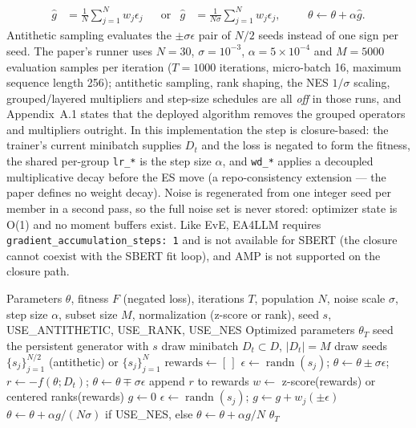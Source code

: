 \begin{align}
\hat g &= \frac{1}{N}\sum_{j=1}^{N} w_j \epsilon_j
&&\text{or}&
\hat g &= \frac{1}{N\sigma}\sum_{j=1}^{N} w_j \epsilon_j,
&&&
\theta \leftarrow \theta + \alpha \hat g .
\end{align}
Antithetic sampling evaluates the $\pm\sigma\epsilon$ pair of $N/2$ seeds instead of one sign per seed. The paper's runner uses $N = 30$, $\sigma = 10^{-3}$, $\alpha = 5\times 10^{-4}$ and $M = 5000$ evaluation samples per iteration ($T = 1000$ iterations, micro-batch 16, maximum sequence length 256); antithetic sampling, rank shaping, the NES $1/\sigma$ scaling, grouped/layered multipliers and step-size schedules are all \emph{off} in those runs, and Appendix~A.1 states that the deployed algorithm removes the grouped operators and multipliers outright. In this implementation the step is closure-based: the trainer's current minibatch supplies $D_t$ and the loss is negated to form the fitness, the shared per-group \texttt{lr\_*} is the step size $\alpha$, and \texttt{wd\_*} applies a decoupled multiplicative decay before the ES move (a repo-consistency extension --- the paper defines no weight decay). Noise is regenerated from one integer seed per member in a second pass, so the full noise set is never stored: optimizer state is O(1) and no moment buffers exist. Like EvE, EA4LLM requires \texttt{gradient\_accumulation\_steps: 1} and is not available for SBERT (the closure cannot coexist with the SBERT fit loop), and AMP is not supported on the closure path.

\begin{algorithm}[H]
\caption{EA4LLM (Zeroth-Order Evolution Strategies)}
\label{alg:ea4llm}
\begin{algorithmic}[1]
\Require Parameters $\theta$, fitness $F$ (negated loss), iterations $T$, population $N$, noise scale $\sigma$, step size $\alpha$, subset size $M$, normalization (z-score or rank), seed $s$, USE\_ANTITHETIC, USE\_RANK, USE\_NES
\Ensure Optimized parameters $\theta_T$
\State seed the persistent generator with $s$
    \State draw minibatch $D_t \subset D$, $|D_t| = M$ 
    \State draw seeds $\{s_j\}_{j=1}^{N/2}$ (antithetic) or $\{s_j\}_{j=1}^{N}$
    \State $\text{rewards} \gets [\,]$ 
        \State $\epsilon \gets \operatorname{randn}(s_j)$; \quad $\theta \gets \theta \pm \sigma\epsilon$; \quad $r \gets -f(\theta; D_t)$; \quad $\theta \gets \theta \mp \sigma\epsilon$
        \State append $r$ to rewards
    \EndFor
    \State $w \gets$ z-score(rewards) or centered ranks(rewards)
    \State $g \gets 0$ 
        \State $\epsilon \gets \operatorname{randn}(s_j)$; \quad $g \gets g + w_j (\pm\epsilon)$
    \EndFor
    \State $\theta \gets \theta + \alpha g / (N\sigma)$ if USE\_NES, else $\theta \gets \theta + \alpha g / N$
\EndFor
\State \Return $\theta_T$
\end{algorithmic}
\end{algorithm}

